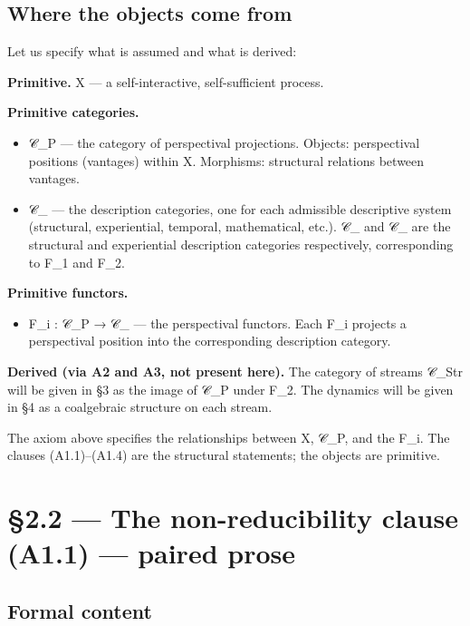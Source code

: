 \documentclass[11pt, openany]{book}
\newcommand{\sectionbreak}{\clearpage}
\begin{document}
\subsection{Where the objects come from}

Let us specify what is assumed and what is derived:

\textbf{Primitive.} X --- a self-interactive, self-sufficient process.

\textbf{Primitive categories.}
\begin{itemize}
\item 𝒞\_\allowbreak{}P --- the category of perspectival projections. Objects: perspectival positions (vantages) within X. Morphisms: structural relations between vantages.
\item 𝒞\_ --- the description categories, one for each admissible descriptive system (structural, experiential, temporal, mathematical, etc.). 𝒞\_ and 𝒞\_ are the structural and experiential description categories respectively, corresponding to F\_\allowbreak{}1 and F\_\allowbreak{}2.
\end{itemize}

\textbf{Primitive functors.}
\begin{itemize}
\item F\_\allowbreak{}i : 𝒞\_\allowbreak{}P → 𝒞\_ --- the perspectival functors. Each F\_\allowbreak{}i projects a perspectival position into the corresponding description category.
\end{itemize}

\textbf{Derived (via A2 and A3, not present here).} The category of streams 𝒞\_\allowbreak{}Str will be given in §3 as the image of 𝒞\_\allowbreak{}P under F\_\allowbreak{}2. The dynamics will be given in §4 as a coalgebraic structure on each stream.

The axiom above specifies the relationships between X, 𝒞\_\allowbreak{}P, and the F\_\allowbreak{}i. The clauses (A1.1)–(A1.4) are the structural statements; the objects are primitive.

\sectionbreak

\section{§2.2 --- The non-reducibility clause (A1.1) --- paired prose}

\subsection{Formal content}
\end{document}
